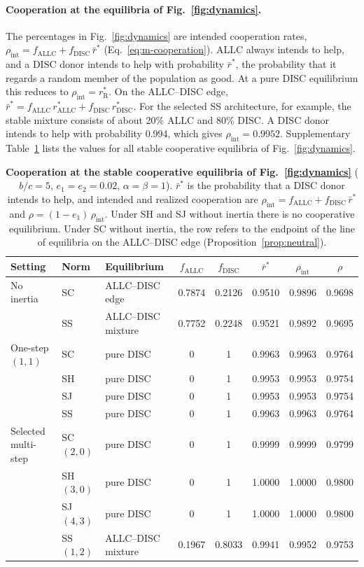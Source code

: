 \documentclass[10pt]{wlscirep}
\newcommand{\rR}{r_{\mathrm{R}}^{*}}
\newcommand{\ALLC}{\mathrm{ALLC}}
\newcommand{\DISC}{\mathrm{DISC}}
\theoremstyle{plain}
\theoremstyle{remark}
\begin{document}
\paragraph{Cooperation at the equilibria of Fig.~\ref{fig:dynamics}.} The percentages in Fig.~\ref{fig:dynamics} are intended cooperation rates, $\rho_{\mathrm{int}}=f_{\ALLC}+f_{\DISC}\,\bar r^*$ (Eq.~\eqref{eq:m-cooperation}). ALLC always intends to help, and a DISC donor intends to help with probability $\bar r^*$, the probability that it regards a random member of the population as good. At a pure DISC equilibrium this reduces to $\rho_{\mathrm{int}}=\rR$. On the ALLC--DISC edge, $\bar r^*=f_{\ALLC}\,r^*_{\ALLC}+f_{\DISC}\,r^*_{\DISC}$. For the selected SS architecture, for example, the stable mixture consists of about 20\% ALLC and 80\% DISC. A DISC donor intends to help with probability 0.994, which gives $\rho_{\mathrm{int}}=0.9952$. Supplementary Table~\ref{tab:si-equilibria} lists the values for all stable cooperative equilibria of Fig.~\ref{fig:dynamics}.

\begin{table}[!htbp]
\centering
\caption{\textbf{Cooperation at the stable cooperative equilibria of Fig.~\ref{fig:dynamics}} ($b/c=5$, $e_1=e_2=0.02$, $\alpha=\beta=1$). $\bar r^*$ is the probability that a DISC donor intends to help, and intended and realized cooperation are $\rho_{\mathrm{int}}=f_{\ALLC}+f_{\DISC}\,\bar r^*$ and $\rho=(1-e_1)\,\rho_{\mathrm{int}}$. Under SH and SJ without inertia there is no cooperative equilibrium. Under SC without inertia, the row refers to the endpoint of the line of equilibria on the ALLC--DISC edge (Proposition~\ref{prop:neutral}).}
\label{tab:si-equilibria}
\small
\begin{tabular}{@{}lllccccc@{}}
\toprule
Setting & Norm & Equilibrium & $f_{\ALLC}$ & $f_{\DISC}$ & $\bar r^*$ & $\rho_{\mathrm{int}}$ & $\rho$\\
\midrule
No inertia & SC & ALLC--DISC edge & 0.7874 & 0.2126 & 0.9510 & 0.9896 & 0.9698\\
 & SS & ALLC--DISC mixture & 0.7752 & 0.2248 & 0.9521 & 0.9892 & 0.9695\\
One-step $(1,1)$ & SC & pure DISC & 0 & 1 & 0.9963 & 0.9963 & 0.9764\\
 & SH & pure DISC & 0 & 1 & 0.9953 & 0.9953 & 0.9754\\
 & SJ & pure DISC & 0 & 1 & 0.9953 & 0.9953 & 0.9754\\
 & SS & pure DISC & 0 & 1 & 0.9963 & 0.9963 & 0.9764\\
Selected multi-step & SC $(2,0)$ & pure DISC & 0 & 1 & 0.9999 & 0.9999 & 0.9799\\
 & SH $(3,0)$ & pure DISC & 0 & 1 & 1.0000 & 1.0000 & 0.9800\\
 & SJ $(4,3)$ & pure DISC & 0 & 1 & 1.0000 & 1.0000 & 0.9800\\
 & SS $(1,2)$ & ALLC--DISC mixture & 0.1967 & 0.8033 & 0.9941 & 0.9952 & 0.9753\\
\bottomrule
\end{tabular}
\end{table}
\end{document}
